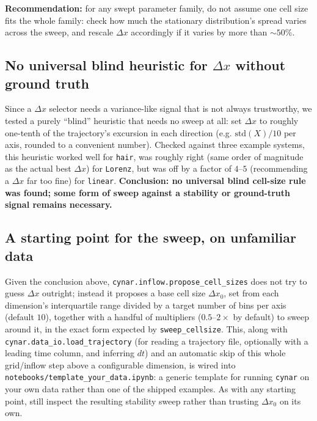 \documentclass[11pt]{article}
\begin{document}
\textbf{Recommendation:} for any swept parameter family, do not assume one cell size fits the whole family: check how much the stationary distribution's spread varies across the sweep, and rescale $\Delta x$ accordingly if it varies by more than $\sim50\%$.


\subsection{No universal blind heuristic for $\Delta x$ without ground truth}
\label{sec:dx-blind}

Since a $\Delta x$ selector needs a variance-like signal that is not always trustworthy, we tested a purely ``blind'' heuristic that needs no sweep at all: set $\Delta x$ to roughly one-tenth of the trajectory's excursion in each direction (e.g. $\mathrm{std}(X)/10$ per axis, rounded to a convenient number). Checked against three example systems, this heuristic worked well for \texttt{hair}, was roughly right (same order of magnitude as the actual best $\Delta x$) for \texttt{Lorenz}, but was off by a factor of $4$--$5$ (recommending a $\Delta x$ far too fine) for \texttt{linear}. \textbf{Conclusion: no universal blind cell-size rule was found; some form of sweep against a stability or ground-truth signal remains necessary.}

\subsection{A starting point for the sweep, on unfamiliar data}
\label{sec:dx-propose}

Given the conclusion above, \texttt{cynar.inflow.propose\_cell\_sizes} does not try to guess $\Delta x$ outright; instead it proposes a base cell size $\Delta x_0$, set from each dimension's interquartile range divided by a target number of bins per axis (default $10$), together with a handful of multipliers ($0.5$--$2\times$ by default) to sweep around it, in the exact form expected by \texttt{sweep\_cellsize}. This, along with \texttt{cynar.data\_io.load\_trajectory} (for reading a trajectory file, optionally with a leading time column, and inferring $dt$) and an automatic skip of this whole grid/inflow step above a configurable dimension, is wired into \texttt{notebooks/template\_your\_data.ipynb}: a generic template for running \texttt{cynar} on your own data rather than one of the shipped examples. As with any starting point, still inspect the resulting stability sweep rather than trusting $\Delta x_0$ on its own.
\end{document}
